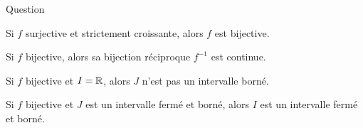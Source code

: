 \begin{multi}[multiple,feedback=
{La bijection réciproque d'une fonction continue est continue. En particulier cela implique que pour \(f^{-1} : J \to I\), si \(J\) est un intervalle fermé et borné, alors \(I\) aussi.
}]{Question}
    \item* Si \(f\) surjective et strictement croissante, alors \(f\) est bijective.
    \item* Si \(f\) bijective, alors sa bijection réciproque \(f^{-1}\) est continue.
    \item Si \(f\) bijective et \(I=\mathbb{R}\), alors \(J\) n'est pas un intervalle borné.
    \item* Si \(f\) bijective et \(J\) est un intervalle fermé et borné, alors \(I\) est un intervalle fermé et borné.
\end{multi}
